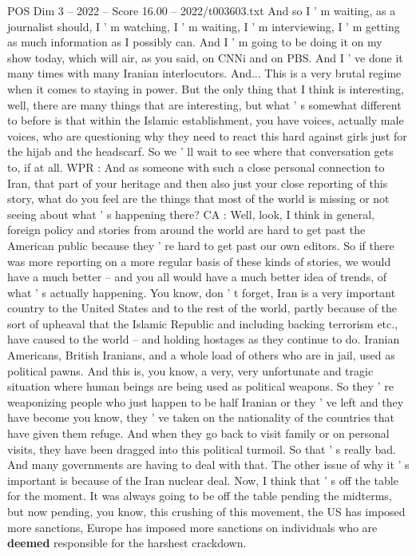 \begin{textsample}{POS Dim 3 – 2022 – Score 16.00 – 2022/t003603.txt}
And so I ' m waiting, as a journalist should, I ' m watching, I ' m waiting, I ' m interviewing, I ' m getting as much information as I possibly can.
And I ' m going to be doing it on my show today, which will air, as you said, on CNNi and on PBS.
And I ' ve done it many times with many Iranian interlocutors.
And...
This is a very brutal regime when it comes to staying in power.
But the only thing that I think is interesting, well, there are many things that are interesting, but what ' s somewhat different to before is that within the Islamic establishment, you have voices, actually male voices, who are questioning why they need to react this hard against girls just for the hijab and the headscarf.
So we ' ll wait to see where that conversation gets to, if at all.
WPR : And as someone with such a close personal connection to Iran, that part of your heritage and then also just your close reporting of this story, what do you feel are the things that most of the world is missing or not seeing about what ' s happening there?
CA : Well, look, I think in general, foreign policy and stories from around the world are hard to get past the American public because they ' re hard to get past our own editors.
So if there was more reporting on a more regular basis of these kinds of stories, we would have a much better -- and you all would have a much better idea of trends, of what ' s actually happening.
You know, don ' t forget, Iran is a very important country to the United States and to the rest of the world, partly because of the sort of upheaval that the Islamic Republic and including backing terrorism etc., have caused to the world -- and holding hostages as they continue to do.
Iranian Americans, British Iranians, and a whole load of others who are in jail, used as political pawns.
And this is, you know, a very, very unfortunate and tragic situation where human beings are being used as political weapons.
So they ' re weaponizing people who just happen to be half Iranian or they ' ve left and they have become you know, they ' ve taken on the nationality of the countries that have given them refuge.
And when they go back to visit family or on personal visits, they have been dragged into this political turmoil.
So that ' s really bad.
And many governments are having to deal with that.
The other issue of why it ' s important is because of the Iran nuclear deal.
Now, I think that ' s off the table for the moment.
It was always going to be off the table pending the midterms, but now pending, you know, this crushing of this movement, the US has imposed more sanctions, Europe has imposed more sanctions on individuals who are \textbf{deemed} responsible for the harshest crackdown.

\end{textsample}

